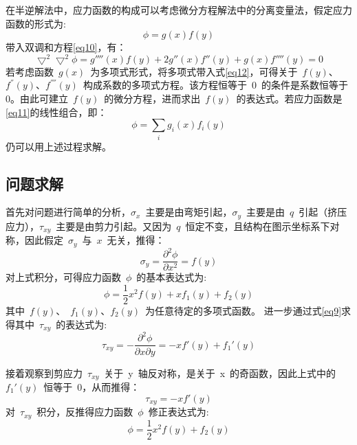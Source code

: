 在半逆解法中，应力函数的构成可以考虑微分方程解法中的分离变量法，假定应力函数的形式为:
\begin{equation}\label{eq11}
    \phi = g(x)f(y)
\end{equation}
带入双调和方程\eqref{eq10}，有：
\begin{equation}\label{eq12}
    \bigtriangledown^2\bigtriangledown^2 \phi = g''''(x)f(y)+2g''(x)f''(y)+g(x)f''''(y) = 0
\end{equation}
若考虑函数~$g(x)$~为多项式形式，将多项式带入式\eqref{eq12}，可得关于~$f(y)$、$f^{''}(y)$、$f^{''''}(y)$~构成系数的多项式方程。该方程恒等于~0~的条件是系数恒等于0。由此可建立~$f(y)$~的微分方程，进而求出~$f(y)$~的表达式。若应力函数是\eqref{eq11}的线性组合，即：
\begin{equation}\label{eq13}
    \phi = \sum_{i} g_i(x)f_i(y)
\end{equation}
仍可以用上述过程求解。
\subsection{问题求解}
首先对问题进行简单的分析，$\sigma_x$~主要是由弯矩引起，$\sigma_y$~主要是由~$q$~引起（挤压应力），$\tau_{xy}$~主要是由剪力引起。又因为~$q$~恒定不变，且结构在图示坐标系下对称，因此假定~$\sigma_y$~与~$x$~无关，推得：
\begin{equation}\label{eq14}
    \sigma_y = \frac{\partial^2 \phi}{\partial x^2} = f(y)
\end{equation}
对上式积分，可得应力函数~$\phi$~的基本表达式为:
\begin{equation}\label{eq15}
    \phi = \frac{1}{2}x^2f(y)+xf_1(y)+f_2(y)
\end{equation}
其中~$f(y)$、~$f_1(y)$、$f_2(y)$~为任意待定的多项式函数。
进一步通过式\eqref{eq9}求得其中~$\tau_{xy}$~的表达式为:
\begin{equation}\label{eq16}
    \tau_{xy} = -\frac{\partial^2 \phi}{\partial x \partial y} = -xf'(y)+f_1'(y)
\end{equation}

接着观察到剪应力~$\tau_{xy}$~关于~y~轴反对称，是关于~x~的奇函数，因此上式中的~$f_1'(y)$~恒等于~0，从而推得：
\begin{equation}\label{eq17}
    \tau_{xy} = -xf'(y)
\end{equation}
对~$\tau_{xy}$~积分，反推得应力函数~$\phi$~修正表达式为:
\begin{equation}\label{eq18}
    \phi = \frac{1}{2}x^2f(y)+f_2(y)
\end{equation}  

